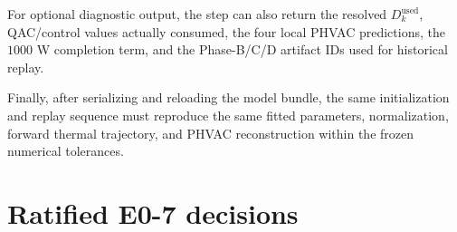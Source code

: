\documentclass[11pt]{article}
\begin{document}
For optional diagnostic output, the step can also return the resolved
$D_k^{\mathrm{used}}$, QAC/control values actually consumed, the four local
PHVAC predictions, the $1000$ W completion term, and the Phase-B/C/D artifact
IDs used for historical replay.

Finally, after serializing and reloading the model bundle, the same
initialization and replay sequence must reproduce the same fitted parameters,
normalization, forward thermal trajectory, and PHVAC reconstruction within the
frozen numerical tolerances.

\section{Ratified E0-7 decisions}
\end{document}
